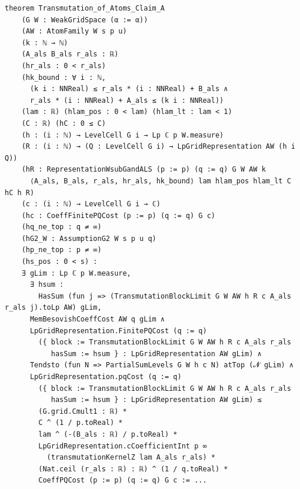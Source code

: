 \documentclass[11pt]{amsart}
\theoremstyle{definition}
\begin{document}
\begin{lstlisting}[style=lean,basicstyle=\ttfamily\scriptsize]
theorem Transmutation_of_Atoms_Claim_A
    (G W : WeakGridSpace (α := α))
    (AW : AtomFamily W s p u)
    (k : ℕ → ℕ)
    (A_als B_als r_als : ℝ)
    (hr_als : 0 < r_als)
    (hk_bound : ∀ i : ℕ,
      (k i : NNReal) ≤ r_als * (i : NNReal) + B_als ∧
      r_als * (i : NNReal) + A_als ≤ (k i : NNReal))
    (lam : ℝ) (hlam_pos : 0 < lam) (hlam_lt : lam < 1)
    (C : ℝ) (hC : 0 ≤ C)
    (h : (i : ℕ) → LevelCell G i → Lp ℂ p W.measure)
    (R : (i : ℕ) → (Q : LevelCell G i) → LpGridRepresentation AW (h i Q))
    (hR : RepresentationWsubGandALS (p := p) (q := q) G W AW k
      ⟨A_als, B_als, r_als, hr_als, hk_bound⟩ lam hlam_pos hlam_lt C hC h R)
    (c : (i : ℕ) → LevelCell G i → ℂ)
    (hc : CoeffFinitePQCost (p := p) (q := q) G c)
    (hq_ne_top : q ≠ ∞)
    (hG2_W : AssumptionG2 W s p u q)
    (hp_ne_top : p ≠ ∞)
    (hs_pos : 0 < s) :
    ∃ gLim : Lp ℂ p W.measure,
      ∃ hsum :
        HasSum (fun j => (TransmutationBlockLimit G W AW h R c A_als r_als j).toLp AW) gLim,
      MemBesovishCoeffCost AW q gLim ∧
      LpGridRepresentation.FinitePQCost (q := q)
        ({ block := TransmutationBlockLimit G W AW h R c A_als r_als
           hasSum := hsum } : LpGridRepresentation AW gLim) ∧
      Tendsto (fun N => PartialSumLevels G W h c N) atTop (𝓝 gLim) ∧
      LpGridRepresentation.pqCost (q := q)
        ({ block := TransmutationBlockLimit G W AW h R c A_als r_als
           hasSum := hsum } : LpGridRepresentation AW gLim) ≤
        (G.grid.Cmult1 : ℝ) *
        C ^ (1 / p.toReal) *
        lam ^ (-(B_als : ℝ) / p.toReal) *
        LpGridRepresentation.cCoefficientInt p ∞
          (transmutationKernelZ lam A_als r_als) *
        (Nat.ceil (r_als : ℝ) : ℝ) ^ (1 / q.toReal) *
        CoeffPQCost (p := p) (q := q) G c := ...


\end{lstlisting}
\end{document}
